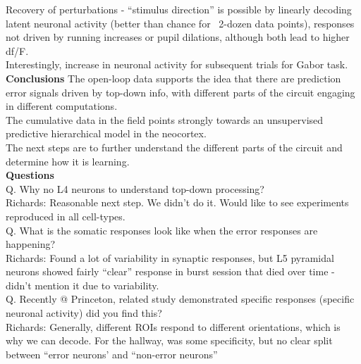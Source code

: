 \documentclass[12pt]{article}
\begin{document}
Recovery of perturbations - ``stimulus direction'' is possible by linearly decoding latent neuronal activity (better than chance for ~2-dozen data points), responses not driven by running increases or pupil dilations, although both lead to higher df/F. \\

Interestingly, increase in neuronal activity for subsequent trials for Gabor task. \\

\textbf{Conclusions}
The open-loop data supports the idea that there are prediction error signals driven by top-down info, with different parts of the circuit engaging in different computations. \\

The cumulative data in the field points strongly towards an unsupervised predictive hierarchical model in the neocortex. \\

The next steps are to further understand the different parts of the circuit and determine how it is learning. \\

\textbf{Questions} \\

Q. Why no L4 neurons to understand top-down processing? \\

Richards: Reasonable next step. We didn't do it. Would like to see experiments reproduced in all cell-types. \\

Q. What is the somatic responses look like when the error responses are happening? \\

Richards: Found a lot of variability in synaptic responses, but L5 pyramidal neurons showed fairly ``clear'' response in burst session that died over time - didn't mention it due to variability. \\

Q. Recently @ Princeton, related study demonstrated specific responses (specific neuronal activity) did you find this? \\

Richards: Generally, different ROIs respond to different orientations, which is why we can decode. For the hallway, was some specificity, but no clear split between ``error neurons' and ``non-error neurons'' \\

\end{document}
